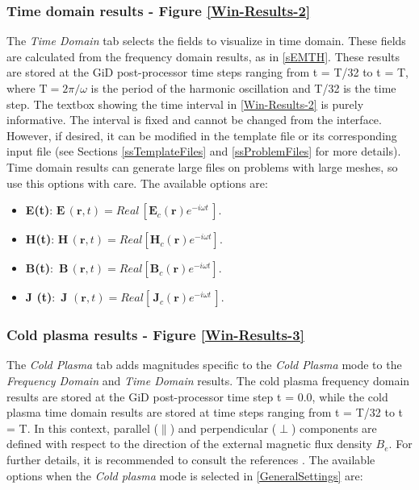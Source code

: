 \subsubsection{Time domain results - Figure \ref{Win-Results-2}}

The \textit{Time Domain} tab selects the fields to visualize in time domain. These fields are calculated from the frequency domain results, as in \ref{sEMTH}. These results are stored at the GiD post-processor time steps ranging from t = T/32 to t = T, where $\text{T} = 2\pi/\omega$ is the period of the harmonic oscillation and T/32 is the time step. The textbox showing the time interval in \ref{Win-Results-2} is purely informative. The interval is fixed and cannot be changed from the interface. However, if desired, it can be modified in the template file  or its corresponding input file  (see Sections \ref{ssTemplateFiles} and \ref{ssProblemFiles} for more details). Time domain results can generate large files on problems with large meshes, so use this options with care. The available options are:

\begin{itemize}\itemsep0em 
	\item \textbf{E(t)}: $\mathbf{E}\,(\mathbf{r},t) = Real\,\left[\mathbf{E}_{c}(\mathbf{r})e^{-i\omega t}\,\right]$.
	\quad
	\item \textbf{H(t)}: $\mathbf{H}\,(\mathbf{r},t) = Real\left[\mathbf{H}_{c}(\mathbf{r})e^{-i\omega t}\right]$.
	\quad
	\item \textbf{B(t)}: \,$\mathbf{B}\,(\mathbf{r},t) = Real\left[\mathbf{B}_{c}(\mathbf{r})e^{-i\omega t}\right]$.
	\quad
	\item \textbf{J (t)}: \,$\mathbf{J}\,\,(\mathbf{r},t) = Real\left[\,\mathbf{J}_{c}(\mathbf{r})e^{-i\omega t}\,\right]$.
\end{itemize}

\subsubsection{Cold plasma results - Figure \ref{Win-Results-3}}

The \textit{Cold Plasma} tab adds magnitudes specific to the \textit{Cold Plasma} mode to the \textit{Frequency Domain} and \textit{Time Domain} results. The cold plasma frequency domain results are stored at the GiD post-processor time step t = 0.0, while the cold plasma time domain results are stored at time steps ranging from t = T/32 to t = T. In this context, parallel ($\parallel$) and perpendicular ($\perp$) components are defined with respect to the direction of the external magnetic flux density $B_{e}$. For further details, it is recommended to consult the references \cite{Swanson, Stix}. The available options when the \textit{Cold plasma} mode is selected in \ref{GeneralSettings} are:

